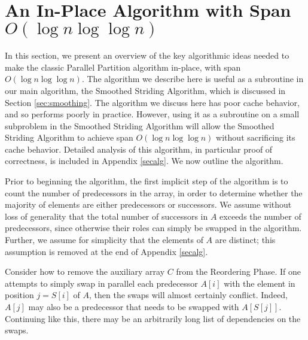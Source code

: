 \documentclass[twocolumn,10pt]{article}
\renewcommand{\paragraph}[1]{\vspace{0.09in}\noindent{\bf \boldmath #1.}}
\theoremstyle{remark}
\theoremstyle{remark}
\begin{document}
\section{An In-Place Algorithm with Span $O(\log n \log \log n)$}
In this section, we present an overview of the key algorithmic ideas needed to
make the classic Parallel Partition algorithm in-place, with span $O(\log n \log\log n)$.
The algorithm we describe here is useful as a subroutine in our main algorithm,
the Smoothed Striding Algorithm, which is discussed in Section
\ref{sec:smoothing}.
The algorithm we discuss here has poor cache behavior, and so performs poorly
in practice. However, using it as a subroutine on a small subproblem in the
Smoothed Striding Algorithm will allow the Smoothed Striding Algorithm to achieve span $O(\log n \log\log n)$
without sacrificing its cache behavior. 
Detailed analysis of this algorithm, in particular proof of correctness, is
included in Appendix \ref{secalg}.
We now outline the algorithm. 

\paragraph{Algorithm Outline}
Prior to beginning the algorithm, the first implicit step of the
algorithm is to count the number of predecessors in the array, in
order to determine whether the majority of elements are either
predecessors or successors. We assume without loss of generality that the total
number of successors in $A$ exceeds the number of predecessors, since otherwise
their roles can simply be swapped in the algorithm. Further, we assume for
simplicity that the elements of $A$ are distinct; this assumption is removed at
the end of Appendix \ref{secalg}.

Consider how to remove the auxiliary array $C$ from the Reordering
Phase. If one attempts to simply swap in parallel each predecessor
$A[i]$ with the element in position $j = S[i]$ of $A$, then the swaps
will almost certainly conflict. Indeed, $A[j]$ may also be a
predecessor that needs to be swapped with $A[S[j]]$. Continuing like
this, there may be an arbitrarily long list of dependencies on the
swaps.
\end{document}
